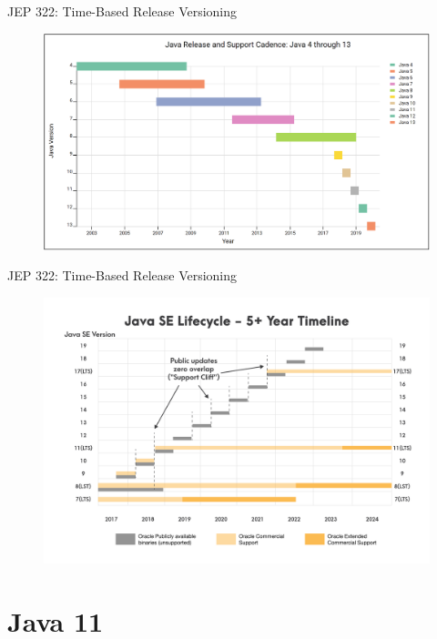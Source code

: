 \documentclass[aspectratio=169]{beamer}
\begin{document}
\begin{frame}[fragile]{JEP 322: Time-Based Release Versioning}
    \begin{figure}
        \centering
        \includegraphics[width=0.9\linewidth]{Images/javacadence}
    \end{figure}
\end{frame}
   
\begin{frame}[fragile]{JEP 322: Time-Based Release Versioning}
    \begin{figure}
        \centering
        \includegraphics[width=0.9\linewidth]{Images/javarelease}
    \end{figure}
\end{frame}

{
    \section{Java 11}
}
\end{document}
